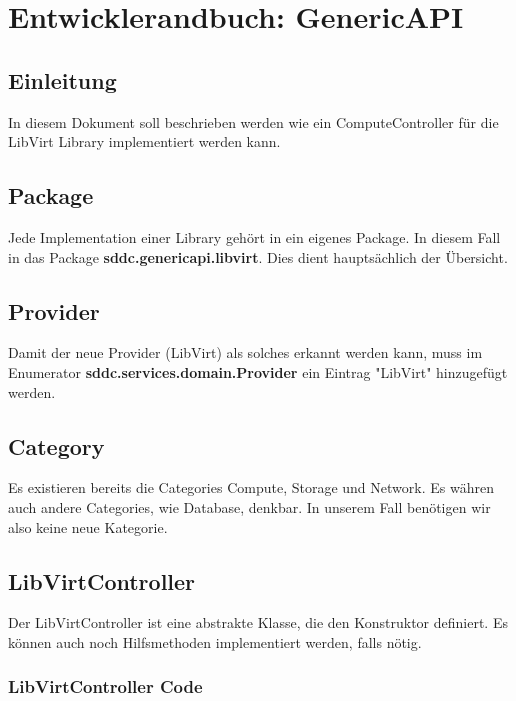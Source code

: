 \chapter{Entwicklerandbuch: GenericAPI}
\section{Einleitung}
In diesem Dokument soll beschrieben werden wie ein ComputeController für die LibVirt Library implementiert werden kann. 

\section{Package}
Jede Implementation einer Library gehört in ein eigenes Package. In diesem Fall in das Package 
\textbf{sddc.genericapi.libvirt}. Dies dient hauptsächlich der Übersicht.

\section{Provider}
Damit der neue Provider (LibVirt) als solches erkannt werden kann, muss im Enumerator 
\textbf{sddc.services.domain.Provider} ein Eintrag "LibVirt" hinzugefügt werden.


\section{Category}
Es existieren bereits die Categories Compute, Storage und Network. Es währen auch andere Categories, wie Database, denkbar. In unserem Fall benötigen wir also keine neue Kategorie.

\newpage

\section{LibVirtController}
Der LibVirtController ist eine abstrakte Klasse, die den Konstruktor definiert. Es können auch noch Hilfsmethoden implementiert werden, falls nötig.

\subsection{LibVirtController Code}

